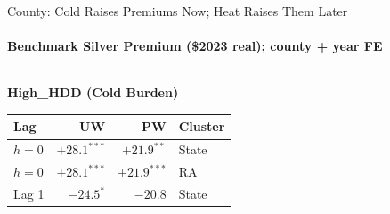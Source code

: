 \documentclass[aspectratio=169,11pt]{beamer}
\newcommand{\emphcolor}[1]{{\color{WarmOrange}\textbf{#1}}}
\newcommand{\tealtext}[1]{{\color{Teal}#1}}
\begin{document}
\begin{frame}{County: Cold Raises Premiums Now; Heat Raises Them Later}
  \framesubtitle{Benchmark Silver Premium (\$2023 real); county + year FE}
  \small
  \begin{columns}[T]
    \begin{column}{0.47\textwidth}
      \tealtext{\textbf{High\_HDD (Cold Burden)}}\\[0.25em]
      \begin{tabular}{lrrl}
        \toprule
        Lag & UW & PW & Cluster \\
        \midrule
        $h{=}0$ & \emphcolor{$+28.1^{***}$} & \emphcolor{$+21.9^{**}$}  & State \\
        $h{=}0$ & \emphcolor{$+28.1^{***}$} & \emphcolor{$+21.9^{***}$} & RA    \\
        Lag 1   & $-24.5^{*}$  & $-20.8$  & State \\
        \bottomrule
      \end{tabular}
      \vspace{0.4em}


\end{column}
\end{columns}
\end{frame}
\end{document}

